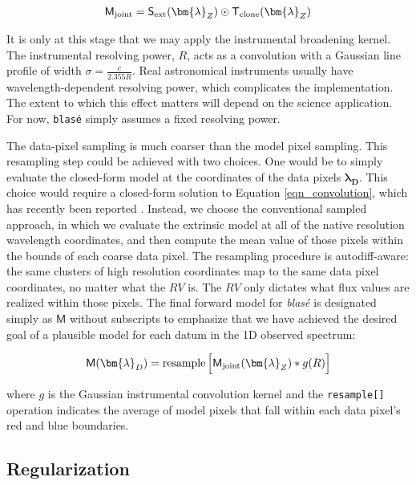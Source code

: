\documentclass[modern]{aastex631}
\DeclareMathOperator{\resample}{resample}
\begin{document}
\begin{eqnarray}
    \mathsf{M}_{\rm joint} = \mathsf{S}_{\rm ext}(\bm{\lambda}_Z) \odot \mathsf{T}_{\rm clone}(\bm{\lambda}_Z)
\end{eqnarray}

It is only at this stage that we may apply the instrumental broadening kernel.  The instrumental resolving power, $R$, acts as a convolution with a Gaussian line profile of width $\sigma=\frac{c}{2.355 R}$.  Real astronomical instruments usually have wavelength-dependent resolving power, which complicates the implementation.  The extent to which this effect matters will depend on the science application.  For now, \texttt{blas\'e} simply assumes a fixed resolving power.

The data-pixel sampling is much coarser than the model pixel sampling.  This resampling step could be achieved with two choices.  One would be to simply evaluate the closed-form model at the coordinates of the data pixels $\bm{\lambda_D}$.  This choice would require a closed-form solution to Equation \ref{eqn_convolution}, which has recently been reported \citep{2021arXiv211006271L}.  Instead, we choose the conventional sampled approach, in which we evaluate the extrinsic model at all of the native resolution wavelength coordinates, and then compute the mean value of those pixels within the bounds of each coarse data pixel.  The resampling procedure is autodiff-aware: the same clusters of high resolution coordinates map to the same data pixel coordinates, no matter what the $RV$ is.  The $RV$ only dictates what flux values are realized within those pixels.  The final forward model for \emph{blas\'e} is designated simply as $\mathsf{M}$ without subscripts to emphasize that we have achieved the desired goal of a plausible model for each datum in the 1D observed spectrum:

\begin{eqnarray}
    \mathsf{M}(\bm{\lambda}_D) = \resample{\Big[\mathsf{M}_{\rm joint}(\bm{\lambda}_Z) * g(R) \Big]} \label{eqn_final_model}
\end{eqnarray}

where $g$ is the Gaussian instrumental convolution kernel and the \texttt{resample[]} operation indicates the average of model pixels that fall within each data pixel's red and blue boundaries.

\subsection{Regularization}
\end{document}
